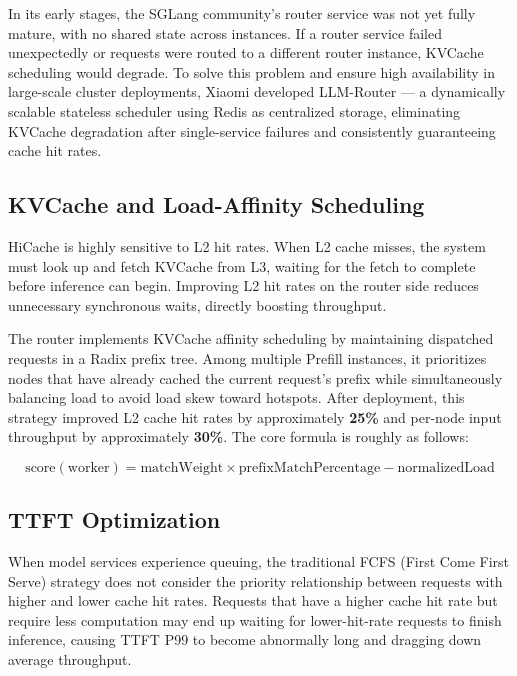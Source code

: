 In its early stages, the SGLang community's router service was not yet fully mature, with no shared state across instances. If a router service failed unexpectedly or requests were routed to a different router instance, KVCache scheduling would degrade. To solve this problem and ensure high availability in large-scale cluster deployments, Xiaomi developed LLM-Router --- a dynamically scalable stateless scheduler using Redis as centralized storage, eliminating KVCache degradation after single-service failures and consistently guaranteeing cache hit rates.

\subsection{KVCache and Load-Affinity Scheduling}

HiCache is highly sensitive to L2 hit rates. When L2 cache misses, the system must look up and fetch KVCache from L3, waiting for the fetch to complete before inference can begin. Improving L2 hit rates on the router side reduces unnecessary synchronous waits, directly boosting throughput.

The router implements KVCache affinity scheduling by maintaining dispatched requests in a Radix prefix tree. Among multiple Prefill instances, it prioritizes nodes that have already cached the current request's prefix while simultaneously balancing load to avoid load skew toward hotspots. After deployment, this strategy improved L2 cache hit rates by approximately \textbf{25\%} and per-node input throughput by approximately \textbf{30\%}. The core formula is roughly as follows:

\begin{equation}
\text{score}(\text{worker}) = \text{matchWeight} \times \text{prefixMatchPercentage} - \text{normalizedLoad}
\label{eq:router_score}
\end{equation}

\subsection{TTFT Optimization}

When model services experience queuing, the traditional FCFS (First Come First Serve) strategy does not consider the priority relationship between requests with higher and lower cache hit rates. Requests that have a higher cache hit rate but require less computation may end up waiting for lower-hit-rate requests to finish inference, causing TTFT P99 to become abnormally long and dragging down average throughput.

